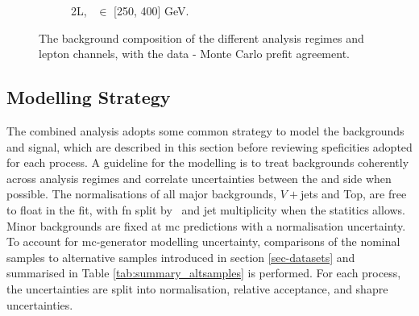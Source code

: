 \begin{figure}[h!]
{\begin{subfigure}[b]{0.38\textwidth}
            \caption{2L, \ptv\ $\in$ [250, 400] GeV.}
            \label{fig:backCom_2L_3}
        \end{subfigure} 
    }
    \caption{The background composition of the different analysis regimes and lepton channels, with the data - Monte Carlo prefit agreement.}
    \label{fig:backCom}
\end{figure} 
  
\subsection{Modelling Strategy}\label{sec-modStrat}
The combined analysis adopts some common strategy to model the backgrounds and signal, which are described in this section before reviewing speficities adopted for each process. A guideline for the modelling is to treat backgrounds coherently across analysis regimes and correlate uncertainties between the \vhb and \vhc side when possible. The normalisations of all major backgrounds, $V+$jets and Top, are free to float in the fit, with \gls{fn} split by \ptv\ and jet multiplicity when the statitics allows. Minor backgrounds are fixed at \gls{mc} predictions with a normalisation uncertainty. To account for \gls{mc}-generator modelling uncertainty, comparisons of the nominal samples to alternative samples introduced in section \ref{sec-datasets} and summarised in Table \ref{tab:summary_altsamples} is performed. For each process, the uncertainties are split into normalisation, relative acceptance, and shapre uncertainties.  %

